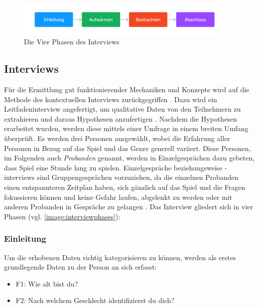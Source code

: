 
\begin{figure}
    \begin{center}
        \includegraphics[width=400px]{0.bilder/interviewphases.png}
    \end{center}
    \caption{Die Vier Phasen des Interviews} \label{image:interviewphases}
\end{figure}
\subsection{Interviews}
Für die Ermittlung gut funktionierender Mechaniken und Konzepte wird auf die Methode des kontextuellen Interviews zurückgegriffen \cite*[]{holtzblatt_beyer_1997}. Dazu wird ein Leitfadeninterview angefertigt, um qualitative Daten von den Teilnehmern zu extrahieren und daraus Hypothesen anzufertigen \cite*[]{baur_blasius}. Nachdem die Hypothesen erarbeitet wurden, werden diese mittels einer Umfrage in einem breiten Umfang überprüft. Es werden drei Personen ausgewählt, wobei die Erfahrung aller Personen in Bezug auf das Spiel und das Genre generell variiert. Diese Personen, im Folgenden auch \textit{Probanden} genannt, werden in Einzelgesprächen dazu gebeten, dass Spiel eine Stunde lang zu spielen. Einzelgespräche beziehungsweise -interviews sind Gruppengesprächen vorzuziehen, da die einzelnen Probanden einen entspannteren Zeitplan haben, sich gänzlich auf das Spiel und die Fragen fokussieren können und keine Gefahr laufen, abgelenkt zu werden oder mit anderen Probanden in Gespräche zu gelangen \cite*[]{lankoski_bjork}. Das Interview gliedert sich in vier Phasen (vgl. \autoref{image:interviewphases}):
\subsubsection{Einleitung}
Um die erhobenen Daten richtig kategorisieren zu können, werden als erstes grundlegende Daten zu der Person an sich erfasst:
\begin{itemize}
    \item F1: Wie alt bist du?
    \item F2: Nach welchem Geschlecht identifizierst du dich?
\end{itemize}

